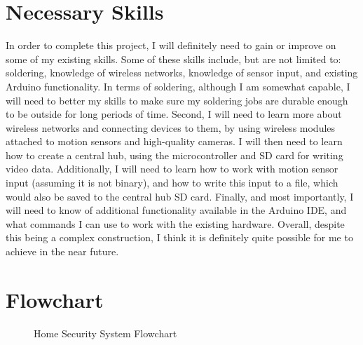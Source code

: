 \documentclass[conference]{IEEEtran}
\begin{document}
\vspace{10pt}

\section{Necessary Skills}

In order to complete this project, I will definitely need to gain or improve on some of my existing skills. Some of these skills include, but are not limited to: soldering, knowledge of wireless networks, knowledge of sensor input, and existing Arduino functionality. In terms of soldering, although I am somewhat capable, I will need to better my skills to make sure my soldering jobs are durable enough to be outside for long periods of time. Second, I will need to learn more about wireless networks and connecting devices to them, by using wireless modules attached to motion sensors and high-quality cameras. I will then need to learn how to create a central hub, using the microcontroller and SD card for writing video data. Additionally, I will need to learn how to work with motion sensor input (assuming it is not binary), and how to write this input to a file, which would also be saved to the central hub SD card. Finally, and most importantly, I will need to know of additional functionality available in the Arduino IDE, and what commands I can use to work with the existing hardware. Overall, despite this being a complex construction, I think it is definitely quite possible for me to achieve in the near future.

\section{Flowchart}

\begin{figure}[h!]
  \centering
  
  \caption{Home Security System Flowchart}
  \label{fig:1}
\end{figure}
\end{document}
